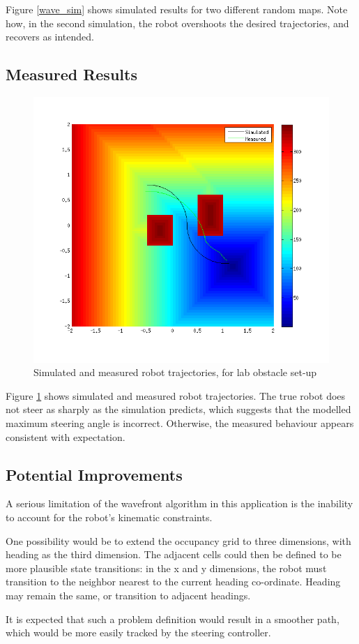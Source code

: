 \documentclass[11pt]{article} %
\begin{document}
Figure \ref{wave_sim} shows simulated results for two different random maps.  Note how, in the second simulation, the robot overshoots the desired trajectories, and recovers as intended.

\clearpage
\subsection{Measured Results}

\begin{figure} [hbt]
 \centering
 \includegraphics[scale=0.75]{wavefront_meas.png}
 \caption{Simulated and measured robot trajectories, for lab obstacle set-up}
 \label{wave_meas}
\end{figure}

Figure \ref{wave_meas} shows simulated and measured robot trajectories.  The true robot does not steer as sharply as the simulation predicts, which suggests that the modelled maximum steering angle is incorrect.  Otherwise, the measured behaviour appears consistent with expectation.

\subsection{Potential Improvements}
A serious limitation of the wavefront algorithm in this application is the inability to account for the robot's kinematic constraints.  

One possibility would be to extend the occupancy grid to three dimensions, with heading as the third dimension.  The adjacent cells could then be defined to be more plausible state transitions:  in the x and y dimensions, the robot must transition to the neighbor nearest to the current heading co-ordinate.  Heading may remain the same, or transition to adjacent headings.

It is expected that such a problem definition would result in a smoother path, which would be more easily tracked by the steering controller.
\end{document}
